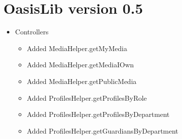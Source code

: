 \section{OasisLib version 0.5}
\begin{itemize}
	\item Controllers
	\begin{itemize}
		\item Added MediaHelper.getMyMedia
		\item Added MediaHelper.getMediaIOwn
		\item Added MediaHelper.getPublicMedia
		\item Added ProfilesHelper.getProfilesByRole
		\item Added ProfilesHelper.getProfilesByDepartment
		\item Added ProfilesHelper.getGuardiansByDepartment
	\end{itemize}
\end{itemize}


